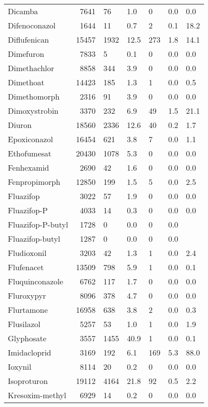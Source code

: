 \begin{longtable}{p{2.5cm}rR{1cm}R{1cm}R{1.2cm}R{1.2cm}R{1.3cm}}
  Dicamba & 7641 & 76 & 1.0 &  0 & 0.0 & 0.0 \\ 
  Difenoconazol & 1644 & 11 & 0.7 &  2 & 0.1 & 18.2 \\ 
  Diflufenican & 15457 & 1932 & 12.5 & 273 & 1.8 & 14.1 \\ 
  Dimefuron & 7833 &  5 & 0.1 &  0 & 0.0 & 0.0 \\ 
  Dimethachlor & 8858 & 344 & 3.9 &  0 & 0.0 & 0.0 \\ 
  Dimethoat & 14423 & 185 & 1.3 &  1 & 0.0 & 0.5 \\ 
  Dimethomorph & 2316 & 91 & 3.9 &  0 & 0.0 & 0.0 \\ 
  Dimoxystrobin & 3370 & 232 & 6.9 & 49 & 1.5 & 21.1 \\ 
  Diuron & 18560 & 2336 & 12.6 & 40 & 0.2 & 1.7 \\ 
  Epoxiconazol & 16454 & 621 & 3.8 &  7 & 0.0 & 1.1 \\ 
  Ethofumesat & 20430 & 1078 & 5.3 &  0 & 0.0 & 0.0 \\ 
  Fenhexamid & 2690 & 42 & 1.6 &  0 & 0.0 & 0.0 \\ 
  Fenpropimorph & 12850 & 199 & 1.5 &  5 & 0.0 & 2.5 \\ 
  Fluazifop & 3022 & 57 & 1.9 &  0 & 0.0 & 0.0 \\ 
  Fluazifop-P & 4033 & 14 & 0.3 &  0 & 0.0 & 0.0 \\ 
  Fluazifop-P-butyl & 1728 &  0 & 0.0 &  0 & 0.0 &  \\ 
  Fluazifop-butyl & 1287 &  0 & 0.0 &  0 & 0.0 &  \\ 
  Fludioxonil & 3203 & 42 & 1.3 &  1 & 0.0 & 2.4 \\ 
  Flufenacet & 13509 & 798 & 5.9 &  1 & 0.0 & 0.1 \\ 
  Fluquinconazole & 6762 & 117 & 1.7 &  0 & 0.0 & 0.0 \\ 
  Fluroxypyr & 8096 & 378 & 4.7 &  0 & 0.0 & 0.0 \\ 
  Flurtamone & 16958 & 638 & 3.8 &  2 & 0.0 & 0.3 \\ 
  Flusilazol & 5257 & 53 & 1.0 &  1 & 0.0 & 1.9 \\ 
  Glyphosate & 3557 & 1455 & 40.9 &  1 & 0.0 & 0.1 \\ 
  Imidacloprid & 3169 & 192 & 6.1 & 169 & 5.3 & 88.0 \\ 
  Ioxynil & 8114 & 20 & 0.2 &  0 & 0.0 & 0.0 \\ 
  Isoproturon & 19112 & 4164 & 21.8 & 92 & 0.5 & 2.2 \\ 
  Kresoxim-methyl & 6929 & 14 & 0.2 &  0 & 0.0 & 0.0 \\ 

\end{longtable}
